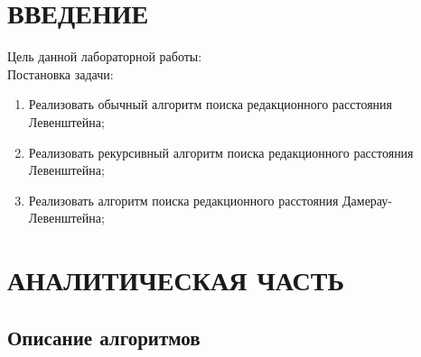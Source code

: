 \documentclass[a4paper,12pt]{article}
\begin{document}
\tableofcontents


\newpage
\section{ВВЕДЕНИЕ}
\begin{flushleft}
Цель данной лабораторной работы:\\
Постановка задачи:\\
\begin{enumerate}
\item Реализовать обычный алгоритм поиска редакционного расстояния Левенштейна;
\item Реализовать рекурсивный алгоритм поиска редакционного расстояния Левенштейна;
\item Реализовать алгоритм поиска редакционного расстояния Дамерау-Левенштейна;
\end{enumerate}
\end{flushleft}


\newpage


\section{АНАЛИТИЧЕСКАЯ ЧАСТЬ}
\subsection{Описание алгоритмов}
\end{document}

